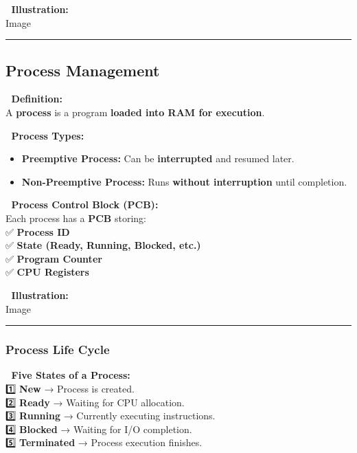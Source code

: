 \documentclass[
]{article}
\providecommand{\tightlist}{%
  \setlength{\itemsep}{0pt}\setlength{\parskip}{0pt}}
\begin{document}
📌 \textbf{Illustration:}\\
{Image}

\begin{center}\rule{0.5\linewidth}{0.5pt}\end{center}

\subsection{\texorpdfstring{\textbf{Process
Management}}{Process Management}}\label{process-management}

📌 \textbf{Definition:}\\
A \textbf{process} is a program \textbf{loaded into RAM for execution}.

📌 \textbf{Process Types:}

\begin{itemize}
\tightlist
\item
  \textbf{Preemptive Process:} Can be \textbf{interrupted} and resumed
  later.
\item
  \textbf{Non-Preemptive Process:} Runs \textbf{without interruption}
  until completion.
\end{itemize}

📌 \textbf{Process Control Block (PCB):}\\
Each process has a \textbf{PCB} storing:\\
✅ \textbf{Process ID}\\
✅ \textbf{State (Ready, Running, Blocked, etc.)}\\
✅ \textbf{Program Counter}\\
✅ \textbf{CPU Registers}

📌 \textbf{Illustration:}\\
{Image}

\begin{center}\rule{0.5\linewidth}{0.5pt}\end{center}

\subsubsection{\texorpdfstring{\textbf{Process Life
Cycle}}{Process Life Cycle}}\label{process-life-cycle}

📌 \textbf{Five States of a Process:}\\
1️⃣ \textbf{New} → Process is created.\\
2️⃣ \textbf{Ready} → Waiting for CPU allocation.\\
3️⃣ \textbf{Running} → Currently executing instructions.\\
4️⃣ \textbf{Blocked} → Waiting for I/O completion.\\
5️⃣ \textbf{Terminated} → Process execution finishes.
\end{document}
